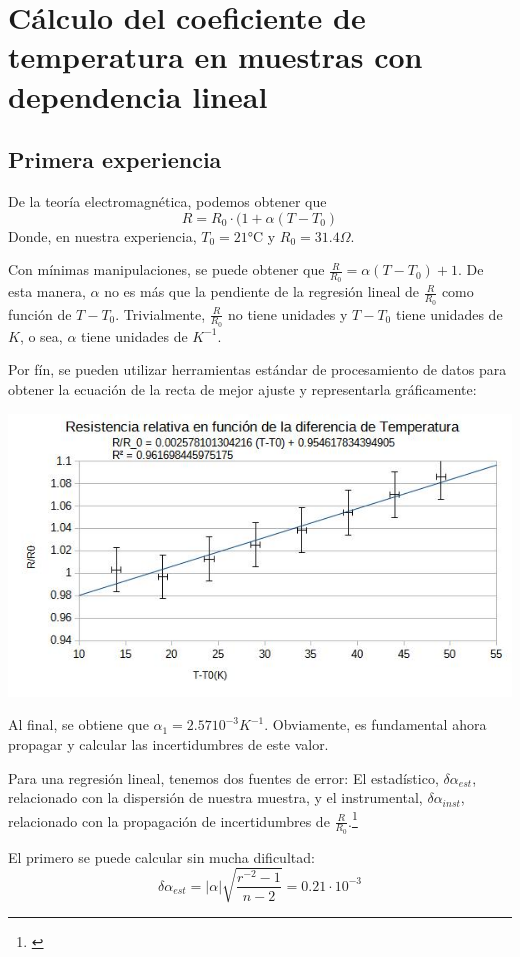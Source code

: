 \documentclass[a4paper,12pt]{article}
\begin{document}
\section{Cálculo del coeficiente de temperatura en muestras con dependencia lineal}
\subsection{Primera experiencia}
De la teoría electromagnética, podemos obtener que 
$$R = R_0\cdot(1+\alpha(T-T_0)$$
Donde, en nuestra experiencia, $T_0 = 21$°C y $R_0 = 31.4\Omega$.

Con mínimas manipulaciones, se puede obtener que $\frac{R}{R_0} = \alpha (T-T_0) + 1$. De esta manera, $\alpha$ no es más que la pendiente de la regresión lineal de $\frac{R}{R_0}$ como función de $T-T_0$. Trivialmente, $\frac{R}{R_0}$ no tiene unidades y $T-T_0$ tiene unidades de $K$, o sea, $\alpha$ tiene unidades de $K^{-1}$.

Por fín, se pueden utilizar herramientas estándar de procesamiento de datos para obtener la ecuación de la recta de mejor ajuste y representarla gráficamente:

\includegraphics[width=\textwidth]{Exp1_GRegr.jpg}

Al final, se obtiene que $\alpha_1 = 2.57 10^{-3} K^{-1}$. Obviamente, es fundamental ahora propagar y calcular las incertidumbres de este valor.

Para una regresión lineal, tenemos dos fuentes de error: El estadístico, $\delta \alpha_{est}$, relacionado con la dispersión de nuestra muestra, y el instrumental, $\delta\alpha_{inst}$, relacionado con la propagación de incertidumbres de $\frac{R}{R_0}$.\footnote{\cite[62-63]{Max}}

El primero se puede calcular sin mucha dificultad:
$$\delta\alpha_{est} = |\alpha|\sqrt{\frac{r^{-2}-1}{n-2}} = 0.21\cdot 10^{-3}$$
\end{document}
